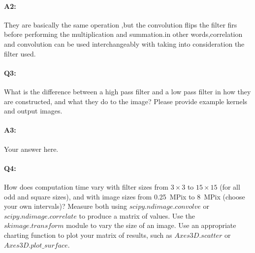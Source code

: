 \paragraph{A2:} They are basically the same operation ,but the convolution flips the filter firs before performing the multiplication and summation.in other words,correlation and convolution can be used interchangeably with taking into consideration the filter used.




\pagebreak
\paragraph{Q3:} What is the difference between a high pass filter and a low pass filter in how they are constructed, and what they do to the image? Please provide example kernels and output images.

\paragraph{A3:} Your answer here.




\pagebreak
\paragraph{Q4:} How does computation time vary with filter sizes from $3\times3$ to $15\times15$ (for all odd and square sizes), and with image sizes from 0.25~MPix to 8~MPix (choose your own intervals)? Measure both using \href{https://docs.scipy.org/doc/scipy/reference/generated/scipy.ndimage.convolve.html}{$scipy.ndimage.convolve$} or \href{https://docs.scipy.org/doc/scipy/reference/generated/scipy.ndimage.correlate.html}{$scipy.ndimage.correlate$} to produce a matrix of values. Use the \href{http://scikit-image.org/docs/dev/auto_examples/transform/plot_rescale.html}{$skimage.transform$} module to vary the size of an image. Use an appropriate charting function to plot your matrix of results, such as \href{https://matplotlib.org/tutorials/toolkits/mplot3d.html#scatter-plots}{$Axes3D.scatter$} or \href{https://matplotlib.org/tutorials/toolkits/mplot3d.html#surface-plots}{$Axes3D.plot\textrm{\_}surface$}.

